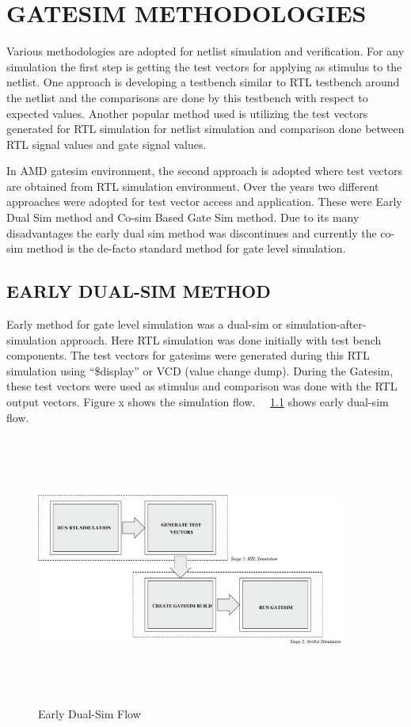 \chapter{GATESIM METHODOLOGIES}
\label{chap:methodologies.tex}

Various methodologies are adopted for netlist simulation and verification. For any simulation the first step is getting the test vectors for applying as stimulus to the netlist. One approach is developing a testbench similar to RTL testbench around the netlist and the comparisons are done by this testbench with respect to expected values. Another popular method used is utilizing the test vectors generated for RTL simulation for netlist simulation and comparison done between RTL signal values and gate signal values. 

In AMD gatesim environment, the second approach is adopted where test vectors are obtained from RTL simulation environment. Over the years two different approaches were adopted for test vector access and application. These were Early Dual Sim method and Co-sim Based Gate Sim method. Due to its many disadvantages the early dual sim method was discontinues and currently the co-sim method is the de-facto standard method for gate level simulation.  


\section{EARLY DUAL-SIM METHOD}
 Early method for gate level simulation was a dual-sim or simulation-after- simulation approach. Here RTL simulation was done initially with test bench components. The test vectors for gatesims were generated during this RTL simulation using ``\$display'' or VCD (value change dump). During the Gatesim, these test vectors were used as stimulus and comparison was done with the RTL output vectors. Figure x shows the simulation flow. ~\figurename{~\ref{fig:earlydualsim.eps}} shows early dual-sim flow.

\begin{figure}[H]
\centering
\includegraphics[width=4in, height=3.5in]{./figures/earlydualsim.eps}
\caption{Early Dual-Sim Flow}
\label{fig:earlydualsim.eps}
\end{figure}

